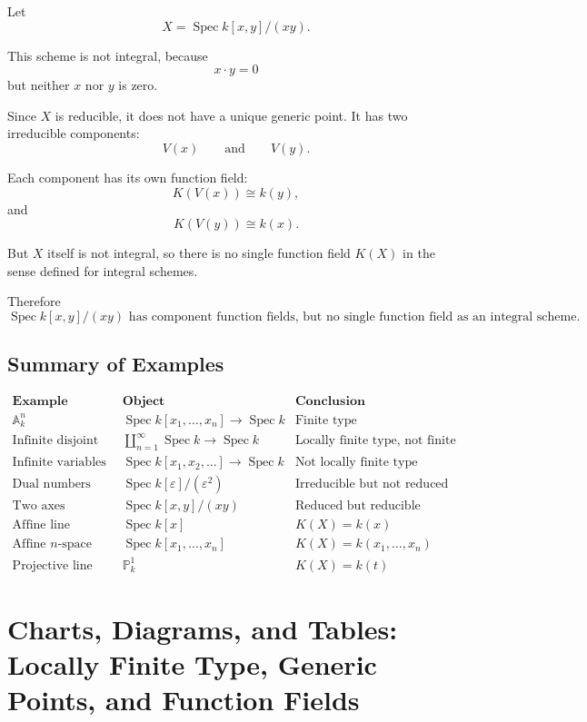 \documentclass[12pt,a4paper]{article}
\theoremstyle{notespace}
\begin{document}
Let
\[
X=\operatorname{Spec}k[x,y]/(xy).
\]

This scheme is not integral, because
\[
x\cdot y=0
\]
but neither \(x\) nor \(y\) is zero.

Since \(X\) is reducible, it does not have a unique generic point. It has two irreducible components:
\[
V(x)
\qquad\text{and}\qquad
V(y).
\]

Each component has its own function field:
\[
K(V(x))\cong k(y),
\]
and
\[
K(V(y))\cong k(x).
\]

But \(X\) itself is not integral, so there is no single function field \(K(X)\) in the sense defined for integral schemes.

Therefore
\[
\boxed{
	\operatorname{Spec}k[x,y]/(xy)
	\text{ has component function fields, but no single function field as an integral scheme.}
}
\]

\subsection{Summary of Examples}

\[
\begin{array}{c|c|c}
	\textbf{Example} & \textbf{Object} & \textbf{Conclusion} \\
	\hline
	\mathbb{A}^n_k &
	\operatorname{Spec}k[x_1,\dots,x_n]\to\operatorname{Spec}k &
	\text{Finite type}
	\\
	\hline
	\text{Infinite disjoint union} &
	\coprod_{n=1}^{\infty}\operatorname{Spec}k\to\operatorname{Spec}k &
	\text{Locally finite type, not finite type}
	\\
	\hline
	\text{Infinite variables} &
	\operatorname{Spec}k[x_1,x_2,\dots]\to\operatorname{Spec}k &
	\text{Not locally finite type}
	\\
	\hline
	\text{Dual numbers} &
	\operatorname{Spec}k[\varepsilon]/(\varepsilon^2) &
	\text{Irreducible but not reduced}
	\\
	\hline
	\text{Two axes} &
	\operatorname{Spec}k[x,y]/(xy) &
	\text{Reduced but reducible}
	\\
	\hline
	\text{Affine line} &
	\operatorname{Spec}k[x] &
	K(X)=k(x)
	\\
	\hline
	\text{Affine }n\text{-space} &
	\operatorname{Spec}k[x_1,\dots,x_n] &
	K(X)=k(x_1,\dots,x_n)
	\\
	\hline
	\text{Projective line} &
	\mathbb{P}^1_k &
	K(X)=k(t)
\end{array}
\]

\section{Charts, Diagrams, and Tables: Locally Finite Type, Generic Points, and Function Fields}
\end{document}
